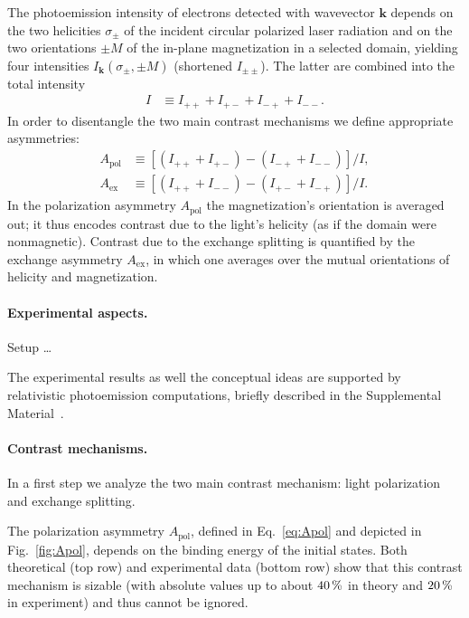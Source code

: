 \documentclass[prl,twocolumn,floatfix]{revtex4-2}
\renewcommand{\vec}[1]{\boldsymbol{#1}}
\begin{document}
The photoemission intensity of electrons detected with wavevector $\vec{k}$ depends on the two helicities $\sigma_{\pm}$ of the incident circular polarized laser radiation and on the two orientations $\pm M$ of the in-plane magnetization in a selected domain, yielding four intensities $I_{\vec{k}}(\sigma_{\pm}, \pm M)$ (shortened $I_{\pm \pm}$). The latter are combined into the total intensity
\begin{align}
    I & \equiv I_{+ +} + I_{+ -} + I_{- +} + I_{- -}. 
\end{align}
In order to disentangle the two main contrast mechanisms we define appropriate asymmetries:
\begin{subequations}
\begin{align}
    A_{\mathrm{pol}} & \equiv \left[ \left( I_{+ +} + I_{+ -} \right) - \left( I_{- +} + I_{- -} \right) \right] / I,
    \label{eq:Apol}
    \\
    A_{\mathrm{ex}} & \equiv \left[ \left( I_{+ +} + I_{- -} \right) - \left( I_{+ -} + I_{- +} \right) \right] / I.
    \label{eq:Aex}
\end{align}    
\end{subequations}
In the polarization asymmetry $A_{\mathrm{pol}}$ the magnetization's orientation is averaged out; it thus encodes contrast due to the light's helicity (as if the domain were nonmagnetic). Contrast due to the exchange splitting is quantified by the exchange asymmetry $A_{\mathrm{ex}}$, in which one averages over the mutual orientations of helicity and magnetization.

\paragraph{Experimental aspects.} Setup \ldots

The experimental results as well the conceptual ideas are supported by relativistic photoemission computations, briefly described in the Supplemental Material~\cite{Supplement}.

\paragraph{Contrast mechanisms.} In a first step we analyze the two main contrast mechanism: light polarization and exchange splitting.

The polarization asymmetry $A_{\mathrm{pol}}$, defined in Eq.~\eqref{eq:Apol} and depicted in Fig.~\ref{fig:Apol}, depends on the binding energy of the initial states. Both theoretical (top row) and experimental data (bottom row) show
that this contrast mechanism is sizable (with absolute values up to about $\unit[40]{\%}$ in theory and $\unit[20]{\%}$ in experiment) and thus cannot be ignored. 
\end{document}
